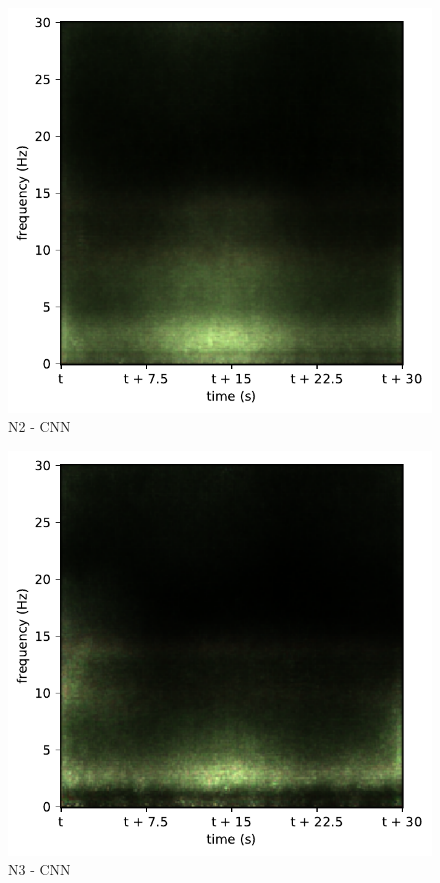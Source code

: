 \begin{subfigure}{.16\textwidth}
  \centering
  \includegraphics[width=1\linewidth]{./pics/class_master_2}
  \caption{N2 - CNN}
  \label{fig_1_23}
\end{subfigure}%
\begin{subfigure}{.16\textwidth}
  \centering
  \includegraphics[width=1\linewidth]{./pics/class_master_3}
  \caption{N3 - CNN}
  \label{fig_1_24}
\end{subfigure}%
